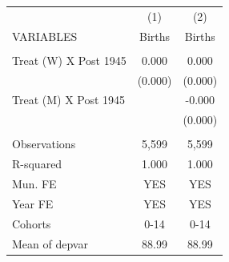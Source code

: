 \begin{tabular}{lcc} \hline
 & (1) & (2) \\
VARIABLES & Births & Births \\ \hline
 &  &  \\
Treat (W) X Post 1945 & 0.000 & 0.000 \\
 & (0.000) & (0.000) \\
Treat (M) X Post 1945 &  & -0.000 \\
 &  & (0.000) \\
 &  &  \\
Observations & 5,599 & 5,599 \\
R-squared & 1.000 & 1.000 \\
Mun. FE & YES & YES \\
Year FE & YES & YES \\
Cohorts & 0-14 & 0-14 \\
 Mean of depvar & 88.99 & 88.99 \\ \hline
\end{tabular}
